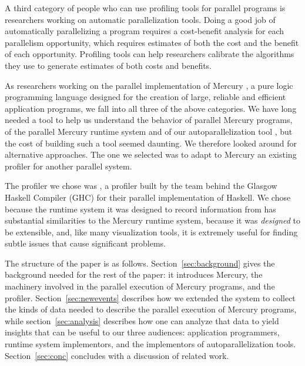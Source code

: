 A third category of people who can use profiling tools for parallel programs
is researchers working on automatic parallelization tools.
Doing a good job of automatically parallelizing a program
requires a cost-benefit analysis for each parallelism opportunity,
which requires estimates of both the cost and the benefit of each opportunity.
Profiling tools can help researchers calibrate
the algorithms they use to generate estimates of both costs and benefits.

As researchers working on the parallel implementation of Mercury \citep{mercury_jlp},
a pure logic programming language designed for
the creation of large, reliable and efficient application programs,
we fall into all three of the above categories.
We have long needed a tool
to help us understand the behavior of parallel Mercury programs,
of the parallel Mercury runtime system
and of our autoparallelization tool \citep{bone:2011:overlap},
but the cost of building such a tool seemed daunting.
We therefore looked around for alternative approaches.
The one we selected was to adapt to Mercury
an existing profiler for another parallel system.

The profiler we chose was \tscope \citep{threadscope},
a profiler built by the team behind the Glasgow Haskell Compiler (GHC)
for their parallel implementation of Haskell.
We chose \tscope because
the runtime system it was designed to record information from
has substantial similarities to the Mercury runtime system,
because it was \emph{designed} to be extensible,
and, like many visualization tools, it is extremely useful
for finding subtle issues that cause significant problems.


The structure of the paper is as follows.
Section~\ref{sec:background} gives the background
needed for the rest of the paper:
it introduces Mercury,
the machinery involved in the parallel execution of Mercury programs,
and the \tscope profiler.
Section~\ref{sec:newevents}
describes how we extended the \tscope system
to collect the kinds of data needed to describe
the parallel execution of Mercury programs,
while section~\ref{sec:analysis} describes how
one can analyze that data to yield insights
that can be useful to our three audiences:
application programmers,
runtime system implementors,
and the implementors of autoparallelization tools.
Section~\ref{sec:conc}
concludes with a discussion of related work.

